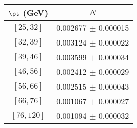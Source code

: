 \begin{tabular}{c||c}
$\pt$ (GeV) & $N$  \\
\hline
$[25, 32]$ & 0.002677 $\pm$ 0.000015\\
$[32, 39]$ & 0.003124 $\pm$ 0.000022\\
$[39, 46]$ & 0.003599 $\pm$ 0.000034\\
$[46, 56]$ & 0.002412 $\pm$ 0.000029\\
$[56, 66]$ & 0.002515 $\pm$ 0.000043\\
$[66, 76]$ & 0.001067 $\pm$ 0.000027\\
$[76, 120]$ & 0.001094 $\pm$ 0.000032\\
\end{tabular}
